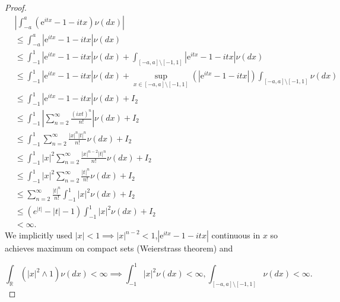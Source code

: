 \documentclass[a4paper,11pt]{article}
\begin{document}
\begin{proof}
    \begin{align}
         & \left|\int_{-a}^{a}\left(\mathrm{e}^{i tx}-1-itx\right) \nu(dx) \right|                                                                                                 \\
         & \leq \int_{-a}^{a}|\mathrm{e}^{i tx}-1-itx| \nu(dx)                                                                                                                     \\
         & \leq \int_{-1}^{1}|\mathrm{e}^{i tx}-1-itx| \nu(dx) + \int_{[-a,a] \setminus [-1,1]}|\mathrm{e}^{i tx}-1-itx| \nu(dx)                                                   \\
         & \leq \int_{-1}^{1}|\mathrm{e}^{i tx}-1-itx| \nu(dx) + \sup_{x \in [-a,a] \setminus [-1,1]}\left(|\mathrm{e}^{i tx}-1-itx|\right) \int_{[-a,a] \setminus [-1,1]} \nu(dx) \\
         & \leq \int_{-1}^{1}|\mathrm{e}^{i tx}-1-itx| \nu(dx) + I_{2}                                                                                                             \\
         & \leq \int_{-1}^{1}\left|\sum_{n=2}^{\infty} \frac{(ixt)^{n}}{n!}\right| \nu(dx) + I_{2}                                                                                 \\
         & \leq \int_{-1}^{1}\sum_{n=2}^{\infty} \frac{|x|^{n}|t|^{n}  }{n!} \nu(dx) + I_{2}                                                                                       \\
         & \leq \int_{-1}^{1}|x|^{2} \sum_{n=2}^{\infty} \frac{|x|^{n-2} |t| ^{n}}{n!} \nu(dx) + I_{2}                                                                             \\
         & \leq \int_{-1}^{1}|x|^{2} \sum_{n=2}^{\infty} \frac{|t|^{n}}{n!} \nu(dx) + I_{2}                                                                                        \\
         & \leq  \sum_{n=2}^{\infty} \frac{|t|^{n}}{n!} \int_{-1}^{1}|x|^{2} \nu(dx) + I_{2}                                                                                       \\
         & \leq  (e^{|t| }-|t| -1)  \int_{-1}^{1}|x|^{2} \nu(dx) + I_{2}                                                                                                           \\
         & < \infty
        .
    \end{align}
    We implicitly used $|x|<1 \implies |x|^{n-2}<1$,$|\mathrm{e}^{i tx}-1-itx|$ continuous in $x$ so achieves maximum on compact sets (Weierstrass theorem) and

    \begin{equation}
        \int_{\mathbb{R}} (|x|^{2} \wedge 1) \nu(dx)<\infty \implies \int_{-1}^{1} |x|^{2} \nu(dx)<\infty, \int_{[-a,a] \setminus [-1,1]} \nu(dx)<\infty   .
    \end{equation}

\end{proof}
\end{document}
